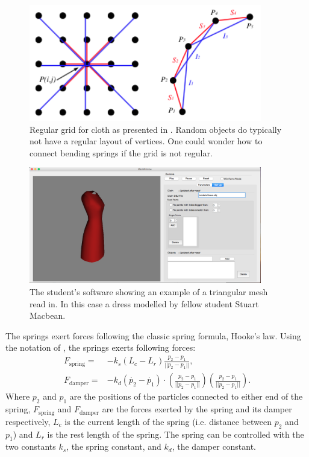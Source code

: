 \begin{figure}[!htb]
  \centering
  \includegraphics[width=4in,natwidth=366,natheight=166]{img/mass_spring_model.png}
  \caption
   {Regular grid for cloth as presented in \cite{provot_model}. Random objects do typically not have a regular layout of vertices. One could wonder how to connect bending springs if the grid is not regular.}
 \label{model_regular}
\end{figure}

\begin{figure}[!htb]
  \centering
  \includegraphics[width=4in,natwidth=366,natheight=166]{img/dress_model.png}
  \caption
   {The student's software showing an example of a triangular mesh read in. In this case a dress modelled by fellow student Stuart Macbean.}
 \label{model_dress}
\end{figure}

The springs exert forces following the classic spring formula, Hooke's law. Using the notation of \cite[chap. 7 ]{parent_book}, the springs exerts following forces:
\begin{equation}
\begin{split}
F_{\mathrm{spring}} = &- k_s (L_c - L_r) \frac{p_2 - p_1}{||p_2 - p_1||},\\
F_{\mathrm{damper}} = &- k_d (\dot{p_2} - \dot{p_1}) \cdot (\frac{p_2 - p_1}{||p_2 - p_1||}) (\frac{p_2 - p_1}{||p_2 - p_1||}).
\end{split}
\end{equation}
Where $p_2$ and $p_1$ are the positions of the particles connected to either end of the spring, $F_{\mathrm{spring}}$ and $F_{\mathrm{damper}}$ are the forces exerted by the spring and its damper respectively, $L_c$ is the current length of the spring (i.e. distance between $p_2$ and $p_1$) and $L_r$ is the rest length of the spring. The spring can be controlled with the two constants $k_s$, the spring constant, and $k_d$, the damper constant.\\

